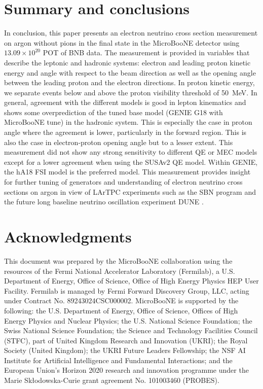 \documentclass[amsmath,amssymb,aps,prd,showpacs,twocolumn,superscriptaddress,letterpaper,longbibliography, floatfix]{revtex4-2}
\begin{document}
\section{Summary and conclusions}
In conclusion, this paper presents an electron neutrino cross section measurement on argon without pions in the final state in the MicroBooNE detector using $13.09\times10^{20}$ POT of BNB data. The measurement is provided in variables that describe the leptonic and hadronic systems: electron and leading proton kinetic energy and angle with respect to the beam direction as well as the opening angle between the leading proton and the electron directions. In proton kinetic energy, we separate events below and above the proton visibility threshold of 50~MeV. In general, agreement with the different models is good in lepton kinematics and shows some overprediction of the tuned base model (GENIE G18 with MicroBooNE tune) in the hadronic system. This is especially the case in proton angle where the agreement is lower, particularly in the forward region. This is also the case in electron-proton opening angle but to a lesser extent. This measurement did not show any strong sensitivity to different QE or MEC models except for a lower agreement when using the SUSAv2 QE model. Within GENIE, the hA18 FSI model is the preferred model.
This measurement provides insight for further tuning of generators and understanding of electron neutrino cross sections on argon in view of LArTPC experiments such as the SBN program \cite{SBN} and the future long baseline neutrino oscillation experiment DUNE \cite{DUNE_ND,DUNE_FD}.
\FloatBarrier
\section{Acknowledgments}
This document was prepared by the MicroBooNE collaboration using the resources of the Fermi National Accelerator Laboratory (Fermilab), a U.S. Department of Energy, Office of Science, Office of High Energy Physics HEP User Facility. Fermilab is managed by Fermi Forward Discovery Group, LLC, acting under Contract No. 89243024CSC000002. MicroBooNE is supported by the
following: 
the U.S. Department of Energy, Office of Science, Offices of High Energy Physics and Nuclear Physics; 
the U.S. National Science Foundation; 
the Swiss National Science Foundation; 
the Science and Technology Facilities Council (STFC), part of United Kingdom Research and Innovation (UKRI);
the Royal Society (United Kingdom);
the UKRI Future Leaders Fellowship;
the NSF AI Institute for Artificial Intelligence and Fundamental Interactions;
and the European Union’s Horizon 2020 research and innovation programme under the Marie Sk\l{}odowska-Curie grant agreement No. 101003460 (PROBES).
\end{document}
